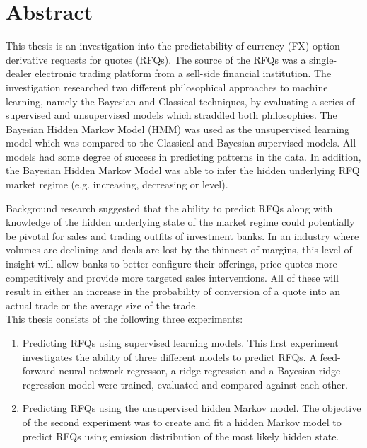 \chapter*{Abstract}
\begin{singlespacing}
This thesis is an investigation into the predictability of currency (FX)
option derivative requests for quotes (RFQs). The source of the RFQs was a
single-dealer electronic trading platform from a sell-side financial
institution. The investigation researched two different philosophical
approaches to machine learning, namely the Bayesian and Classical
techniques, by evaluating a series of supervised and unsupervised models
which straddled both philosophies. The Bayesian Hidden Markov Model (HMM)
was used as the unsupervised learning model which was compared to the
Classical and Bayesian supervised models. All models had some degree of
success in predicting patterns in the data. In addition, the Bayesian Hidden
Markov Model was able to infer the hidden underlying RFQ market regime (e.g. increasing, decreasing or level).

Background research suggested that the ability to predict RFQs
along with knowledge of the hidden underlying state of the market regime
could potentially be pivotal for sales and trading outfits of investment
banks. In an industry where volumes are declining and deals are lost by the
thinnest of margins, this level of insight will allow banks to better
configure their offerings, price quotes more competitively and provide more
targeted sales interventions. All of these will result in either an increase
in the probability of conversion of a quote into an actual trade or the
average size of the trade.\\

This thesis consists of the following three experiments:
\begin{enumerate}
\item Predicting RFQs using supervised learning models. This first experiment investigates the ability of three different models to predict RFQs. A feed-forward neural network regressor, a ridge regression and a Bayesian ridge regression model were trained, evaluated and compared against each other.

\item Predicting RFQs using the unsupervised hidden Markov model. The objective of the second experiment was to create and fit a hidden Markov model to predict RFQs using emission distribution of the most likely hidden state. 


\end{enumerate}
\end{singlespacing}
